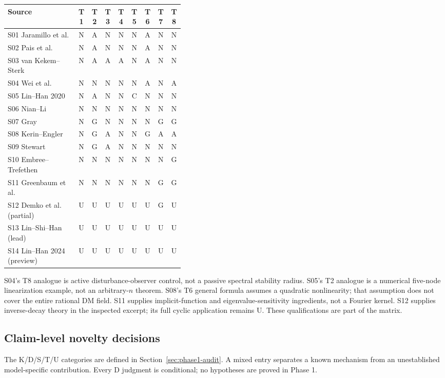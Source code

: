 \begin{center}
\small
\setlength{\tabcolsep}{5pt}
\begin{tabular}{@{}p{0.40\linewidth}*{8}{c}@{}}
\toprule
Source & T1 & T2 & T3 & T4 & T5 & T6 & T7 & T8\\
\midrule
S01 Jaramillo et al. & N&A&N&N&N&A&N&N\\
S02 Pais et al. & N&A&N&N&N&A&N&N\\
S03 van Kekem--Sterk & N&A&A&A&N&A&N&N\\
S04 Wei et al. & N&N&N&N&N&A&N&A\\
S05 Lin--Han 2020 & N&A&N&N&C&N&N&N\\
S06 Nian--Li & N&N&N&N&N&N&N&N\\
S07 Gray & N&G&N&N&N&N&G&G\\
S08 Kerin--Engler & N&G&A&N&N&G&A&A\\
S09 Stewart & N&G&A&N&N&N&N&N\\
S10 Embree--Trefethen & N&N&N&N&N&N&N&G\\
S11 Greenbaum et al. & N&N&N&N&N&N&G&G\\
S12 Demko et al. (partial)&U&U&U&U&U&U&G&U\\
S13 Lin--Shi--Han (lead)&U&U&U&U&U&U&U&U\\
S14 Lin--Han 2024 (preview)&U&U&U&U&U&U&U&U\\
\bottomrule
\end{tabular}
\end{center}

S04's T8 analogue is active disturbance-observer control, not a passive
spectral stability radius. S05's T2 analogue is a numerical five-node
linearization example, not an arbitrary-$n$ theorem. S08's T6 general
formula assumes a quadratic nonlinearity; that assumption does not
cover the entire rational DM field. S11 supplies implicit-function and
eigenvalue-sensitivity ingredients, not a Fourier kernel. S12 supplies
inverse-decay theory in the inspected excerpt; its full cyclic application
remains U. These qualifications are part of the matrix.

\subsection{Claim-level novelty decisions}
The K/D/S/T/U categories are defined in
Section~\ref{sec:phase1-audit}. A mixed entry separates a known mechanism
from an unestablished model-specific contribution. Every D judgment is
conditional; no hypotheses are proved in Phase 1.

